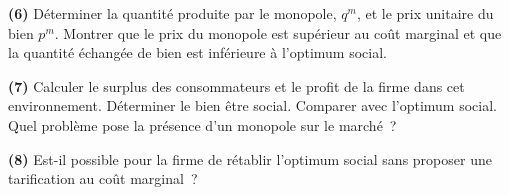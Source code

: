 \documentclass[10pt,a4paper,notitlepage,twocolumn]{article}
\newcommand{\question}[1]{\textbf{(#1)}}
\begin{document}
\question{6} Déterminer la quantité produite par le
monopole, $q^m$, et le prix unitaire du bien $p^m$. Montrer que le
prix du monopole est supérieur au coût marginal et que la quantité
échangée de bien est inférieure à l'optimum social.\newline

\question{7} Calculer le surplus des consommateurs et le profit de la
firme dans cet environnement. Déterminer le bien être social. Comparer
avec l'optimum social. Quel problème pose la présence d'un monopole
sur le marché~?\newline

\question{8} Est-il possible pour la firme de rétablir l'optimum
social sans proposer une tarification au coût marginal~?
\end{document}
